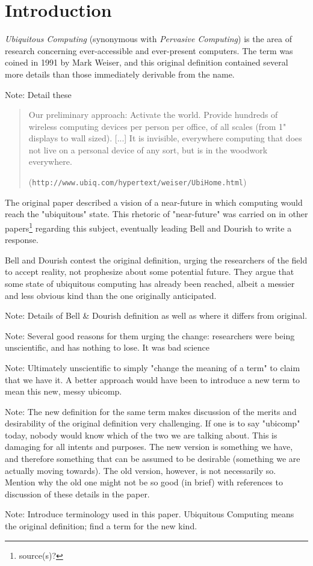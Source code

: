 \section{Introduction}

\emph{Ubiquitous Computing} (synonymous with \emph{Pervasive Computing}) is the area of research concerning
ever-accessible and ever-present computers. The term was coined in 1991 by Mark Weiser, and this original
definition contained several more details than those immediately derivable from the name.

Note: Detail these\cite{weiser91}

\begin{quote}
     Our preliminary approach: Activate the world. Provide hundreds of wireless computing devices per person per
     office, of all scales (from 1" displays to wall sized). [...] It is invisible, everywhere computing that does
     not live on a personal device of any sort, but is in the woodwork everywhere. 
     
    (\verb+http://www.ubiq.com/hypertext/weiser/UbiHome.html+)
\end{quote}

The original paper described a vision of a near-future in which computing would reach the "ubiquitous" state.
This rhetoric of "near-future" was carried on in other papers\footnote{source(s)?} regarding this subject,
eventually leading Bell and Dourish to write a response.

Bell and Dourish contest the original definition, urging the researchers of the field to accept reality, not
prophesize about some potential future. They argue that some state of ubiquitous computing has already been
reached, albeit a messier and less obvious kind than the one originally anticipated.\cite{bell07}

Note: Details of Bell \& Dourish definition as well as where it differs from original.

Note: Several good reasons for them urging the change: researchers were being unscientific, and has nothing to
lose. It was bad science

Note: Ultimately unscientific to simply "change the meaning of a term" to claim that we have it. A better approach
would have been to introduce a new term to mean this new, messy ubicomp.

Note: The new definition for the same term makes discussion of the merits and desirability of the original definition
very challenging. If one is to say "ubicomp" today, nobody would know which of the two we are talking about. This
is damaging for all intents and purposes. The new version is something we have, and therefore something that can be
assumed to be desirable (something we are actually moving towards). The old version, however, is not necessarily so.
Mention why the old one might not be so good (in brief) with references to discussion of these details in the paper.

Note: Introduce terminology used in this paper. Ubiquitous Computing means the original definition; find a term for the
new kind.